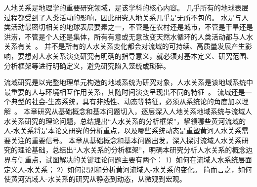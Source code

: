 
人地关系是地理学的重要研究领域，是该学科的核心内容\cite{zhang2022c}。
几乎所有的地球表层过程都受到了人类活动的影响，因此研究人地关系几乎是无所不包的。
水是与人类活动最密切相关的地球表层要素之一，不管是在农村还是城市，不管是干旱还是洪涝，不管是个人还是集体，所有有意或无意改变天然水循环的人类活动都与人水关系有关~\cite{falkenmark2021}。
并不是所有的人水关系变化都会对流域的可持续、高质量发展产生影响，要想对人水关系演变研究有明确的指导意义，就必须对基本定义、研究范围、分析框架等进行明确定义，避免研究陷入笼统或琐碎。

流域研究是以完整地理单元构造的地域系统为研究对象，人水关系是该地域系统中最重要的人与环境相互作用关系，其随时间演变呈现出不同的特征~\cite{wang2019d}。
流域还是一个典型的社会-生态系统，具有非线性、动态等特征，必须从系统论的角度加以理解~\cite{reyers2018,huggins2022}。
本章研究从基础概念和基本问题切入，逐层深入人地关系地域系统与流域人水关系研究的理论问题，总结提出“人水关系的分析框架”，挈领哪些黄河流域的人-水关系将是本论文研究的分析重点，以及哪些系统动态是重塑黄河人水关系需要关注的重要信号。
本章从基础概念和基本问题出发，深入探讨流域人水关系研究的理论基础，总结出“人水关系的分析框架”，明确本研究分析人水关系的概念边界与侧重点，试图解决的关键理论问题主要有两个：
1）如何在流域人水系统层面定义人-水关系；
2）如何识别和分析黄河流域人-水关系的变化。
简而言之，如何使黄河流域人-水关系的研究从静态到动态，从微观到宏观。
